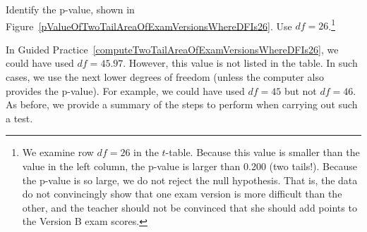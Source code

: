 \begin{exercise} \label{computeTwoTailAreaOfExamVersionsWhereDFIs26}
Identify the p-value, shown in Figure~\ref{pValueOfTwoTailAreaOfExamVersionsWhereDFIs26}. Use $df=26$.\footnote{We examine row $df=26$ in the $t$-table. Because this value is smaller than the value in the left column, the p-value is larger than 0.200 (two tails!). Because the p-value is so large, we do not reject the null hypothesis. That is, the data do not convincingly show that one exam version is more difficult than the other, and the teacher should not be convinced that she should add points to the Version B exam scores.}


\end{exercise}

In Guided Practice~\ref{computeTwoTailAreaOfExamVersionsWhereDFIs26}, we could have used $df=45.97$. However, this value is not listed in the table. In such cases, we use the next lower degrees of freedom (unless the computer also provides the p-value). For example, we could have used $df=45$ but not $df=46$.
As before, we provide a summary of the steps to perform when carrying out such a test.


